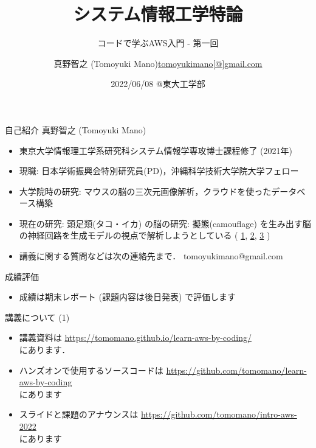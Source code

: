 \documentclass[unicode,11pt]{beamer}
\title{システム情報工学特論}
\subtitle{コードで学ぶAWS入門 - 第一回}
\author{\texorpdfstring{真野智之 (Tomoyuki Mano)\newline\url{tomoyukimano[@]gmail.com}}{Author}}\institute[OIST]{Okinawa Institute of Science and Technology (OIST)}
\date{2022/06/08 @東大工学部}
\begin{document}
\frame{\titlepage}

\begin{frame}{自己紹介}
真野智之 (Tomoyuki Mano)
\begin{itemize}
    \item 東京大学情報理工学系研究科システム情報学専攻博士課程修了 (2021年)
    \item 現職: 日本学術振興会特別研究員(PD)，沖縄科学技術大学院大学フェロー
    \item 大学院時の研究: マウスの脳の三次元画像解析，クラウドを使ったデータベース構築
    \item 現在の研究: 頭足類(タコ・イカ) の脳の研究: 擬態(camouflage) を生み出す脳の神経回路を生成モデルの視点で解析しようとしている
    (
    \href{https://twitter.com/CephWarden/status/1142083856893263872}{1},
    \href{https://twitter.com/CephWarden/status/1384644335069667334}{2},
    \href{https://twitter.com/CephWarden/status/1232307456346181632}{3}
    )
    \item 講義に関する質問などは次の連絡先まで． tomoyukimano@gmail.com
\end{itemize}
\end{frame}

\begin{frame}{成績評価}
\begin{itemize}
    \item 成績は期末レポート (課題内容は後日発表) で評価します
\end{itemize}
\end{frame}

\begin{frame}{講義について (1)}
\begin{itemize}
    \item 講義資料は
    \url{https://tomomano.github.io/learn-aws-by-coding/}\\
    にあります．
    \item ハンズオンで使用するソースコードは \url{https://github.com/tomomano/learn-aws-by-coding}\\
    にあります
    \item スライドと課題のアナウンスは
    \url{https://github.com/tomomano/intro-aws-2022}\\
    にあります
\end{itemize}
\end{frame}
\end{document}
